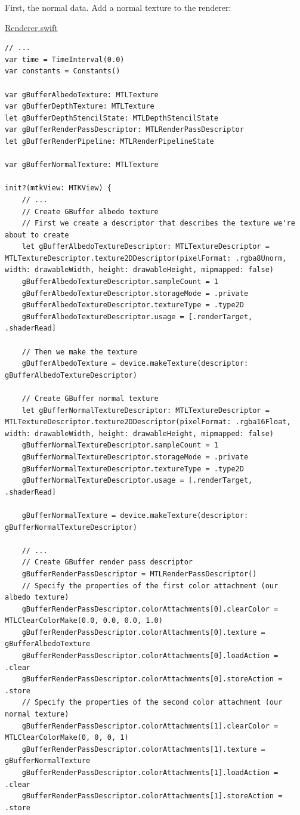 \documentclass[11pt]{article}
\begin{document}
First, the normal data. Add a normal texture to the renderer:

\uline{Renderer.swift}
\begin{verbatim}
// ...
var time = TimeInterval(0.0)
var constants = Constants()

var gBufferAlbedoTexture: MTLTexture
var gBufferDepthTexture: MTLTexture
let gBufferDepthStencilState: MTLDepthStencilState
var gBufferRenderPassDescriptor: MTLRenderPassDescriptor
let gBufferRenderPipeline: MTLRenderPipelineState

var gBufferNormalTexture: MTLTexture

init?(mtkView: MTKView) {
    // ...
    // Create GBuffer albedo texture
    // First we create a descriptor that describes the texture we're about to create
    let gBufferAlbedoTextureDescriptor: MTLTextureDescriptor = MTLTextureDescriptor.texture2DDescriptor(pixelFormat: .rgba8Unorm, width: drawableWidth, height: drawableHeight, mipmapped: false)
    gBufferAlbedoTextureDescriptor.sampleCount = 1
    gBufferAlbedoTextureDescriptor.storageMode = .private
    gBufferAlbedoTextureDescriptor.textureType = .type2D
    gBufferAlbedoTextureDescriptor.usage = [.renderTarget, .shaderRead]

    // Then we make the texture
    gBufferAlbedoTexture = device.makeTexture(descriptor: gBufferAlbedoTextureDescriptor)

    // Create GBuffer normal texture
    let gBufferNormalTextureDescriptor: MTLTextureDescriptor = MTLTextureDescriptor.texture2DDescriptor(pixelFormat: .rgba16Float, width: drawableWidth, height: drawableHeight, mipmapped: false)
    gBufferNormalTextureDescriptor.sampleCount = 1
    gBufferNormalTextureDescriptor.storageMode = .private
    gBufferNormalTextureDescriptor.textureType = .type2D
    gBufferNormalTextureDescriptor.usage = [.renderTarget, .shaderRead]

    gBufferNormalTexture = device.makeTexture(descriptor: gBufferNormalTextureDescriptor)

    // ...
    // Create GBuffer render pass descriptor
    gBufferRenderPassDescriptor = MTLRenderPassDescriptor()
    // Specify the properties of the first color attachment (our albedo texture)
    gBufferRenderPassDescriptor.colorAttachments[0].clearColor = MTLClearColorMake(0.0, 0.0, 0.0, 1.0)
    gBufferRenderPassDescriptor.colorAttachments[0].texture = gBufferAlbedoTexture
    gBufferRenderPassDescriptor.colorAttachments[0].loadAction = .clear
    gBufferRenderPassDescriptor.colorAttachments[0].storeAction = .store
    // Specify the properties of the second color attachment (our normal texture)
    gBufferRenderPassDescriptor.colorAttachments[1].clearColor = MTLClearColorMake(0, 0, 0, 1)
    gBufferRenderPassDescriptor.colorAttachments[1].texture = gBufferNormalTexture
    gBufferRenderPassDescriptor.colorAttachments[1].loadAction = .clear
    gBufferRenderPassDescriptor.colorAttachments[1].storeAction = .store


\end{verbatim}
\end{document}
